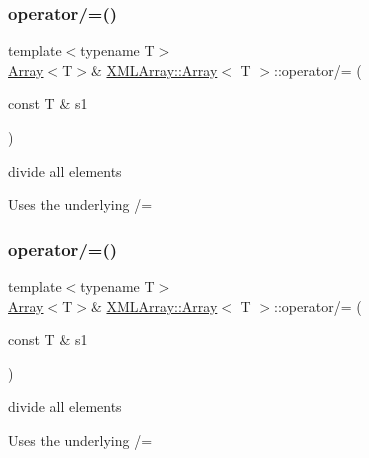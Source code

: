 \subsubsection{\texorpdfstring{operator/=()}{operator/=()}\hspace{0.1cm}{\footnotesize\ttfamily [3/4]}}
{\footnotesize\ttfamily template$<$typename T$>$ \\
\mbox{\hyperlink{classXMLArray_1_1Array}{Array}}$<$T$>$\& \mbox{\hyperlink{classXMLArray_1_1Array}{X\+M\+L\+Array\+::\+Array}}$<$ T $>$\+::operator/= (\begin{DoxyParamCaption}\item[{const T \&}]{s1 }\end{DoxyParamCaption})\hspace{0.3cm}{\ttfamily [inline]}}



divide all elements 

Uses the underlying /= \mbox{\label{classXMLArray_1_1Array_add7ef0354bf795511a654f1241da3318}} 
\subsubsection{\texorpdfstring{operator/=()}{operator/=()}\hspace{0.1cm}{\footnotesize\ttfamily [4/4]}}
{\footnotesize\ttfamily template$<$typename T$>$ \\
\mbox{\hyperlink{classXMLArray_1_1Array}{Array}}$<$T$>$\& \mbox{\hyperlink{classXMLArray_1_1Array}{X\+M\+L\+Array\+::\+Array}}$<$ T $>$\+::operator/= (\begin{DoxyParamCaption}\item[{const T \&}]{s1 }\end{DoxyParamCaption})\hspace{0.3cm}{\ttfamily [inline]}}



divide all elements 

Uses the underlying /= \mbox{\label{classXMLArray_1_1Array_a99fd481573c47ab9a9e35ed597575b0e}} 
